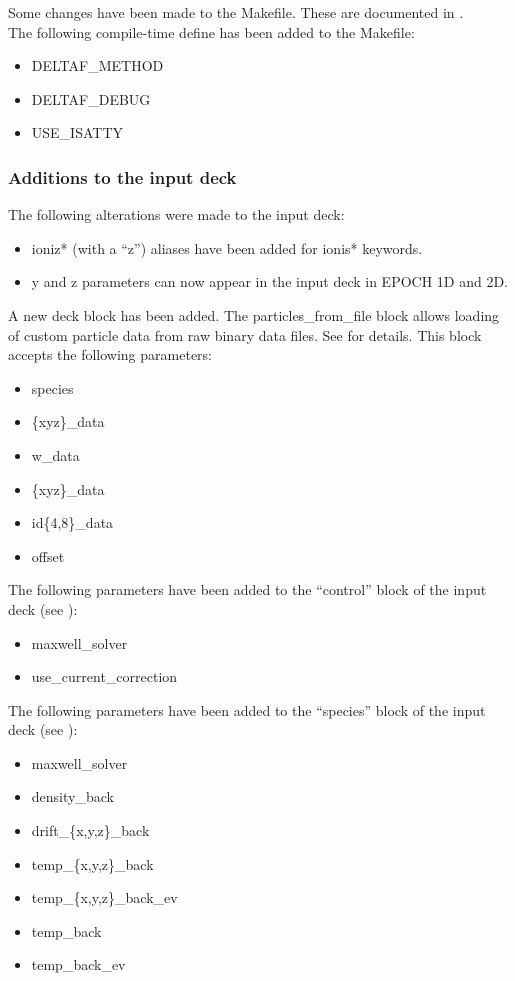 Some changes have been made to the Makefile. These are documented in
.\\

\noindent The following compile-time define has been added to the Makefile:
\begin{itemize}
\item DELTAF\_METHOD
\item DELTAF\_DEBUG
\item USE\_ISATTY
\end{itemize}
\bigskip

\subsubsection{Additions to the input deck}

The following alterations were made to the input deck:
\begin{itemize}
\item ioniz* (with a ``z'') aliases have been added for ionis* keywords.
\item y and z parameters can now appear in the input deck in EPOCH 1D and 2D.
\end{itemize}
\bigskip

A new deck block has been added. The particles\_from\_file block allows loading
of custom particle data from raw binary data files. See
 for details.
This block accepts the following parameters:
\begin{itemize}
\item species
\item \{xyz\}\_data
\item w\_data
\item \{xyz\}\_data
\item id\{4,8\}\_data
\item offset
\end{itemize}
\bigskip

\noindent The following parameters have been added to the ``control'' block of
the input deck (see ):
\begin{itemize}
\item maxwell\_solver
\item use\_current\_correction
\end{itemize}
\bigskip

\noindent The following parameters have been added to the ``species'' block of
the input deck (see ):
\begin{itemize}
\item maxwell\_solver
\item density\_back
\item drift\_\{x,y,z\}\_back
\item temp\_\{x,y,z\}\_back
\item temp\_\{x,y,z\}\_back\_ev
\item temp\_back
\item temp\_back\_ev
\end{itemize}
\bigskip

